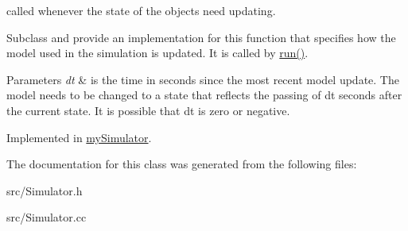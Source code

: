 called whenever the state of the objects need updating. 

Subclass and provide an implementation for this function that specifies how the model used in the simulation is updated. It is called by \mbox{\hyperlink{class_simulator_aa2de7e32b04cc3e8fc60aec23997621b}{run()}}. 
\begin{DoxyParams}{Parameters}
{\em dt} & is the time in seconds since the most recent model update. The model needs to be changed to a state that reflects the passing of dt seconds after the current state. It is possible that dt is zero or negative. \\
\hline
\end{DoxyParams}


Implemented in \mbox{\hyperlink{classmy_simulator_a76beefaa645d7785578a59b9f9d41dc9}{my\+Simulator}}.



The documentation for this class was generated from the following files\+:\begin{DoxyCompactItemize}
\item 
src/Simulator.\+h\item 
src/Simulator.\+cc\end{DoxyCompactItemize}
